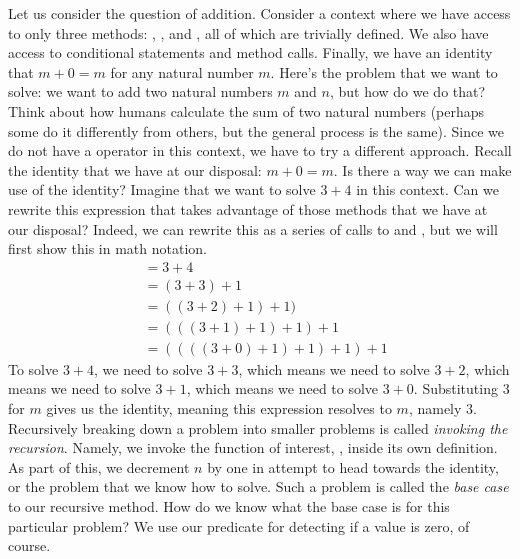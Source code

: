 \example Let us consider the question of addition. Consider a context where we have access to only three methods: , , and , all of which are trivially defined. We also have access to conditional statements and method calls. Finally, we have an identity that $m + 0 = m$ for any natural number $m$. Here's the problem that we want to solve: we want to add two natural numbers $m$ and $n$, but how do we do that? Think about how humans calculate the sum of two natural numbers (perhaps some do it differently from others, but the general process is the same). Since we do not have a \ttt{+} operator in this context, we have to try a different approach. Recall the identity that we have at our disposal: $m + 0 = m$. Is there a way we can make use of the identity? Imagine that we want to solve $3 + 4$ in this context. Can we rewrite this expression that takes advantage of those methods that we have at our disposal? Indeed, we can rewrite this as a series of calls to  and , but we will first show this in math notation.
\begin{align*}
    &= 3 + 4\\
    &= (3 + 3) + 1\\
    &= ((3 + 2) + 1) + 1)\\
    &= (((3 + 1) + 1) + 1) + 1\\
    &= ((((3 + 0) + 1) + 1) + 1) + 1
\end{align*}
To solve $3 + 4$, we need to solve $3 + 3$, which means we need to solve $3 + 2$, which means we need to solve $3 + 1$, which means we need to solve $3 + 0$. Substituting $3$ for $m$ gives us the identity, meaning this expression resolves to $m$, namely $3$. Recursively breaking down a problem into smaller problems is called \textit{invoking the recursion}. Namely, we invoke the function of interest, \ttt{+}, inside its own definition. As part of this, we decrement $n$ by one in attempt to head towards the identity, or the problem that we know how to solve. Such a problem is called the \textit{base case} to our recursive method. How do we know what the base case is for this particular problem? We use our predicate for detecting if a value is zero, of course.

